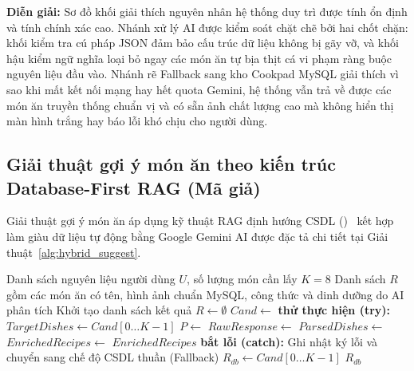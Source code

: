 \noindent\textbf{Diễn giải:} Sơ đồ khối giải thích nguyên nhân hệ thống duy trì được tính ổn định và tính chính xác cao. Nhánh xử lý AI được kiểm soát chặt chẽ bởi hai chốt chặn: khối kiểm tra cú pháp JSON đảm bảo cấu trúc dữ liệu không bị gãy vỡ, và khối hậu kiểm ngữ nghĩa loại bỏ ngay các món ăn tự bịa thịt cá vi phạm ràng buộc nguyên liệu đầu vào. Nhánh rẽ Fallback sang kho Cookpad MySQL giải thích vì sao khi mất kết nối mạng hay hết quota Gemini, hệ thống vẫn trả về được các món ăn truyền thống chuẩn vị và có sẵn ảnh chất lượng cao mà không hiển thị màn hình trắng hay báo lỗi khó chịu cho người dùng.

\subsection{Giải thuật gợi ý món ăn theo kiến trúc Database-First RAG (Mã giả)}

Giải thuật gợi ý món ăn áp dụng kỹ thuật RAG định hướng CSDL ()~\cite{Lewis2020RAG} kết hợp làm giàu dữ liệu tự động bằng Google Gemini AI được đặc tả chi tiết tại Giải thuật~\ref{alg:hybrid_suggest}.

\begin{algorithm}[H]
\caption{Gợi ý món ăn thông minh Database-First RAG và AI Enrichment}
\label{alg:hybrid_suggest}
\begin{algorithmic}[1]
\Require Danh sách nguyên liệu người dùng $U$, số lượng món cần lấy $K = 8$
\Ensure Danh sách $R$ gồm các món ăn có tên, hình ảnh chuẩn MySQL, công thức và dinh dưỡng do AI phân tích
\State Khởi tạo danh sách kết quả $R \gets \emptyset$
\State {}
\State $Cand \gets$ 
    \State \textbf{thử thực hiện (try):}
        \State \quad {}
        \State \quad $TargetDishes \gets Cand[0 \dots K-1]$
        \State \quad $P \gets$ 
        \State \quad $RawResponse \gets$ 
        \State \quad $ParsedDishes \gets$ 
        \State \quad $EnrichedRecipes \gets$ 
        \State \quad {}
        \State \quad {}
        \State \quad \Return $EnrichedRecipes$ 
    \State \textbf{bắt lỗi (catch):}
        \State \quad Ghi nhật ký lỗi và chuyển sang chế độ CSDL thuần (Fallback)
\EndIf
\State {}
\State $R_{db} \gets Cand[0 \dots K-1]$
\State \Return $R_{db}$
\end{algorithmic}
\end{algorithm}

